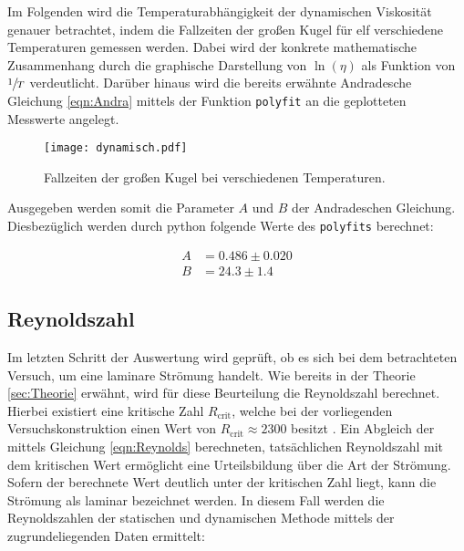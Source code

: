 Im Folgenden wird die Temperaturabhängigkeit der dynamischen Viskosität genauer betrachtet, indem die Fallzeiten 
der großen Kugel für elf verschiedene Temperaturen gemessen werden. Dabei wird der konkrete mathematische Zusammenhang 
durch die graphische Darstellung von $\ln(\eta)$ als Funktion von $\sfrac{1}{T}$ verdeutlicht. Darüber hinaus wird die 
bereits erwähnte Andradesche Gleichung \eqref{eqn:Andra} mittels der Funktion \texttt{polyfit} an die geplotteten Messwerte 
angelegt.

\begin{figure}[H]
    \centering
    \texttt{[image: dynamisch.pdf]}
    \caption{Fallzeiten der großen Kugel bei verschiedenen Temperaturen.}
\end{figure}

\noindent Ausgegeben werden somit die Parameter $A$ und $B$ der Andradeschen Gleichung. Diesbezüglich werden durch 
python folgende Werte des \texttt{polyfits} berechnet:

\begin{align*}
    A &= 0.486 \pm 0.020 \\
    B &= 24.3 \pm 1.4
\end{align*}

\subsection{Reynoldszahl}

Im letzten Schritt der Auswertung wird geprüft, ob es sich bei dem betrachteten Versuch, um eine laminare Strömung handelt.
Wie bereits in der Theorie \ref{sec:Theorie} erwähnt, wird für diese Beurteilung die Reynoldszahl berechnet. Hierbei existiert
eine kritische Zahl $R_\text{crit}$, welche bei der vorliegenden Versuchskonstruktion einen Wert von $R_\text{crit} \approx 2300$
besitzt \cite{Physikalisches_Praktikum}. Ein Abgleich der mittels Gleichung \eqref{eqn:Reynolds} berechneten, tatsächlichen Reynoldszahl mit dem kritischen
Wert ermöglicht eine Urteilsbildung über die Art der Strömung. Sofern der berechnete Wert deutlich unter der kritischen Zahl liegt,
kann die Strömung als laminar bezeichnet werden. In diesem Fall werden die Reynoldszahlen der statischen und dynamischen 
Methode mittels der zugrundeliegenden Daten ermittelt:

